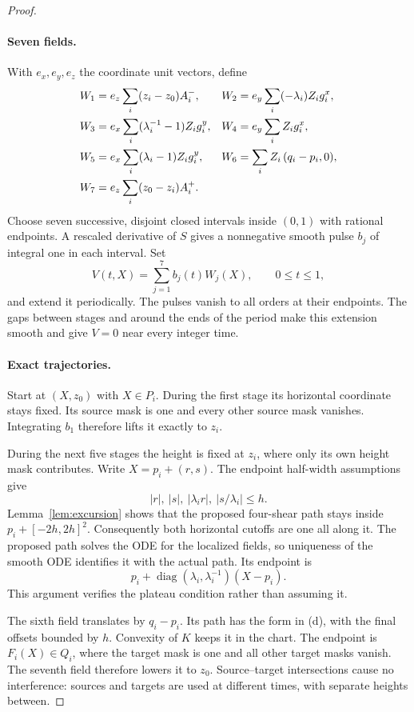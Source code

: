 \documentclass[11pt]{article}
\theoremstyle{remark}
\newcommand{\diag}{\operatorname{diag}}
\begin{document}
\begin{proof}
\paragraph{Seven fields.}
With $e_x,e_y,e_z$ the coordinate unit vectors, define
\begin{align}
 W_1&=e_z\sum_i(z_i-z_0)A_i^-, &
 W_2&=e_y\sum_i(-\lambda_i)Z_i g_i^x,\notag\\
 W_3&=e_x\sum_i(\lambda_i^{-1}-1)Z_i g_i^y, &
 W_4&=e_y\sum_i Z_i g_i^x,\notag\\
 W_5&=e_x\sum_i(\lambda_i-1)Z_i g_i^y, &
 W_6&=\sum_i Z_i\,(q_i-p_i,0),\notag\\
 W_7&=e_z\sum_i(z_0-z_i)A_i^+.&&\label{eq:fields}
\end{align}
Choose seven successive, disjoint closed intervals inside $(0,1)$ with
rational endpoints. A rescaled derivative of $S$ gives a nonnegative
smooth pulse $b_j$ of integral one in each interval. Set
\begin{equation}\label{eq:velocity}
 V(t,X)=\sum_{j=1}^7 b_j(t)W_j(X),\qquad 0\le t\le1,
\end{equation}
and extend it periodically. The pulses vanish to all orders at their
endpoints. The gaps between stages and around the ends of the period
make this extension smooth and give $V=0$ near every integer time.

\paragraph{Exact trajectories.}
Start at $(X,z_0)$ with $X\in P_i$. During the first stage its horizontal
coordinate stays fixed. Its source mask is one and every other source
mask vanishes. Integrating $b_1$ therefore lifts it exactly to $z_i$.

During the next five stages the height is fixed at $z_i$, where only
its own height mask contributes. Write $X=p_i+(r,s)$. The endpoint
half-width assumptions give
\[
 |r|,\ |s|,\ |\lambda_i r|,\ |s/\lambda_i|\le h.
\]
Lemma~\ref{lem:excursion} shows that the proposed four-shear path stays
inside $p_i+[-2h,2h]^2$. Consequently both horizontal cutoffs are one
all along it. The proposed path solves the ODE for the localized fields,
so uniqueness of the smooth ODE identifies it with the actual path.
Its endpoint is
\[
 p_i+\diag(\lambda_i,\lambda_i^{-1})(X-p_i).
\]
This argument verifies the plateau condition rather than assuming it.

The sixth field translates by $q_i-p_i$. Its path has the form in (d),
with the final offsets bounded by $h$. Convexity of $K$ keeps it in the
chart. The endpoint is $F_i(X)\in Q_i$, where the target mask is one
and all other target masks vanish. The seventh field therefore lowers
it to $z_0$. Source--target intersections cause no interference: sources
and targets are used at different times, with separate heights between.


\end{proof}
\end{document}
